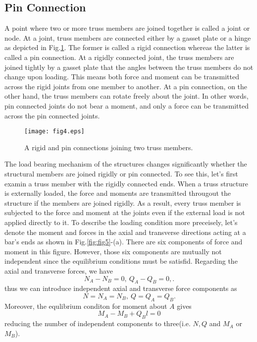 \documentclass[10pt,a4j]{article}
\begin{document}
\subsection{Pin Connection}
A point where two or more truss members are joined together is called a joint or node. 
At a joint, truss members are connected either by a gasset plate or a hinge as depicted 
in Fig.\ref{fig:fig4}. The former is called a rigid connection whereas the latter is called 
a pin connection. At a rigidly connected joint, the truss members are joined 
tightly by a gasset plate that the angles between the truss members do not 
change upon loading. This means both force and moment can be transmitted across 
the rigid joints from one member to another. 
At a pin connection, on the other hand, the truss members can rotate freely about 
the joint. In other words, pin connected joints do not bear a moment, and 
only a force can be transmitted across the pin connected joints. 
\begin{figure}[h]
	\begin{center}
	\texttt{[image: fig4.eps]} 
	\end{center}
	\caption{A rigid and pin connections joining two truss members.} 
	\label{fig:fig4}
\end{figure}

The load bearing mechanism of the structures changes significantly whether the 
structural members are joined rigidly or pin connected. To see this, let's first 
examin a truss member with the rigidly connected ends. When a truss structure is externally loaded, 
the force and moments are transmitted througout the structure if the 
members are joined rigidly. As a result, every truss member is subjected to 
the force and moment at the joints even if the external load is not applied 
directly to it. To describe the loading condition more preceisely, let's 
denote the moment and forces in the axial and transverse directions 
acting at a bar's ends as shown in Fig.\ref{fig:fig5}-(a). 
There are six components of force and moment in this figure. 
However, those six components are  mutually not  independent since 
the equilibrium conditions must be satisfid. 
Regarding the axial and transverse forces, we have 
\begin{equation}
	N_A-N_B=0, \ Q_A-Q_B=0, .
	\label{eqn:}
\end{equation}
thus we can introduce independent axial and transverse force components as
\begin{equation}
	N=N_A=N_B,\  Q=Q_A=Q_B.
	\label{eqn:}
\end{equation}
Moreover, the equlibrium conditon for moment about $A$ gives 
\begin{equation}
	M_A-M_B+Q_Bl=0 
	\label{eqn:equib_Mab}
\end{equation}
reducing the number of independent components to three(i.e. $N,Q$ and $M_A$ or $M_B$).\\
\end{document}
